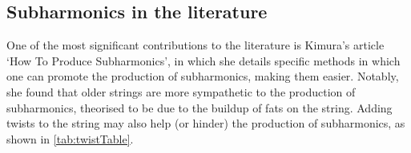 \subsection{Subharmonics in the literature}

One of the most significant contributions to the literature is Kimura's article `How To Produce Subharmonics', in which she details specific methods in which one can promote the production of subharmonics, making them easier.\autocite[]{kimuraHowProduceSubharmonics1999}
Notably, she found that older strings are more sympathetic to the production of subharmonics, theorised to be due to the buildup of fats on the string.
Adding twists to the string may also help (or hinder) the production of subharmonics, as shown in \autoref{tab:twistTable}.\autocite[]{kimuraHowProduceSubharmonics1999}

